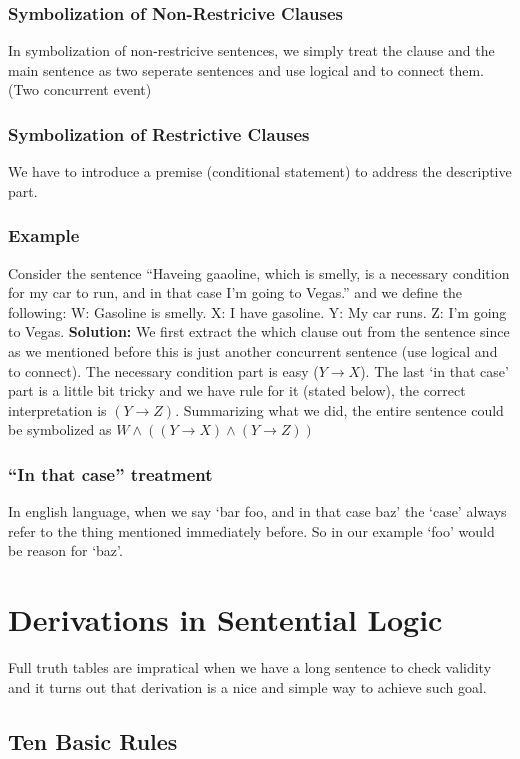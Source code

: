 \documentclass[10pt]{article}
\begin{document}
\subsubsection{Symbolization of Non-Restricive Clauses} In symbolization of
non-restricive sentences, we simply treat the clause and the main sentence 
as two seperate sentences and use logical and to connect them. (Two concurrent
event)
\subsubsection{Symbolization of Restrictive Clauses} We have to introduce a 
premise (conditional statement) to address the descriptive part.

\subsubsection{Example}
Consider the sentence ``Haveing gaaoline, which is smelly, is a necessary 
condition for my car to run, and in that case I'm going to Vegas.'' and we
define the following: W: Gasoline is smelly. X: I have gasoline. Y: My car runs.
Z: I'm going to Vegas. \textbf{Solution:} We first extract the which clause out
from the sentence since as we mentioned before this is just another concurrent 
sentence (use logical and to connect). The necessary condition part is easy ($Y\rightarrow X$).
The last `in that case' part is a little bit tricky and we have rule for it (stated below), 
the correct interpretation is $(Y\rightarrow Z)$. Summarizing what we did, the
entire sentence could be symbolized as $W\land ((Y\rightarrow X)\land (Y\rightarrow Z))$

\subsubsection{``In that case'' treatment}
In english language, when we say `bar foo, and in that case baz' the `case' always refer
to the thing mentioned immediately before. So in our example `foo' would be reason for `baz'.

\section{Derivations in Sentential Logic}
Full truth tables are impratical when we have a long sentence to check validity 
and it turns out that derivation is a nice and simple way to achieve such goal.

\subsection{Ten Basic Rules}
\end{document}
